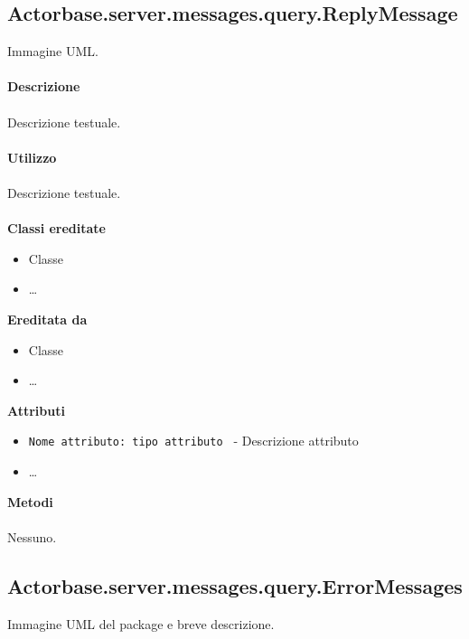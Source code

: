 \documentclass[a4paper]{article}
\begin{document}
	\subsection{Actorbase.server.messages.query.ReplyMessage}
		Immagine UML.
		\\ \\
		\textbf{Descrizione}
			\\ \\
			Descrizione testuale.
			\\ \\
		\textbf{Utilizzo}
			\\ \\
			Descrizione testuale.
			\\ \\
		\textbf{Classi ereditate}
			\begin{itemize}
				\item Classe
				\item \dots
			\end{itemize}
		\textbf{Ereditata da}
			\begin{itemize}
				\item Classe
				\item \dots
			\end{itemize}
		\textbf{Attributi}
			\begin{itemize}
				\item \texttt{Nome attributo: tipo attributo } - Descrizione attributo
				\item \dots
			\end{itemize}
		\textbf{Metodi}
			\\ \\
			Nessuno.
			
	\subsection{Actorbase.server.messages.query.ErrorMessages}
		Immagine UML del package e breve descrizione.
		
\end{document}
